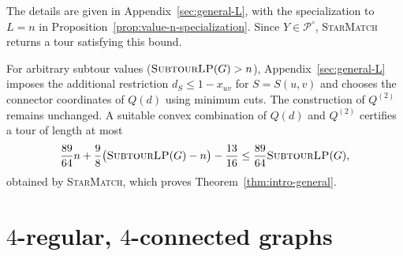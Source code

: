 \documentclass[11pt]{amsart}
\newcommand{\1}{\mathbbm{1}}
\newcommand{\ALG}{\textsc{StarMatch}}
\newcommand{\SubtourLP}{\textsc{SubtourLP}}
\begin{document}
 

{The details are given in Appendix~\ref{sec:general-L},
with the specialization to $L=n$ in
Proposition~\ref{prop:value-n-specialization}.}
Since $Y\in\mathcal P^\circ$, \ALG{} returns a tour
satisfying this bound. 

{For arbitrary subtour values ($\SubtourLP(G)>n$),
Appendix~\ref{sec:general-L} imposes the additional restriction
$d_S\le1-x_{uv}$ for $S=S(u,v)$ and chooses the connector
coordinates of $Q(d)$ using minimum cuts.
The construction of $Q^{(2)}$ remains unchanged.
A suitable convex combination of $Q(d)$ and $Q^{(2)}$
certifies a tour of length at most
\[
 \frac{89}{64}n
 +\frac98\bigl(\text{\SubtourLP}(G)-n\bigr)
 -\frac{13}{16}
 \le\frac{89}{64}\text{\SubtourLP}(G),
\]
obtained by \ALG{},
which proves
Theorem~\ref{thm:intro-general}.}



\section{\texorpdfstring{$4$}{4}-regular, \texorpdfstring{$4$}{4}-connected graphs}
\label{proc:quartic}
\end{document}
